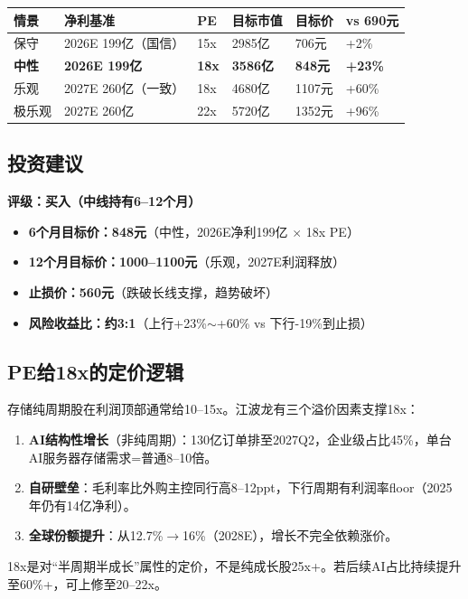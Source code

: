 \documentclass[a4paper,11pt,fontset=none]{ctexart}
\begin{document}
\begin{tabularx}{\textwidth}{L{2cm}L{3cm}L{1.5cm}L{2cm}L{2cm}X}
\toprule
\textbf{情景} & \textbf{净利基准} & \textbf{PE} & \textbf{目标市值} & \textbf{目标价} & \textbf{vs 690元} \\
\midrule
保守 & 2026E 199亿（国信） & 15x & 2985亿 & 706元 & +2\% \\
\textbf{中性} & \textbf{2026E 199亿} & \textbf{18x} & \textbf{3586亿} & \textbf{848元} & \textbf{+23\%} \\
乐观 & 2027E 260亿（一致） & 18x & 4680亿 & 1107元 & +60\% \\
极乐观 & 2027E 260亿 & 22x & 5720亿 & 1352元 & +96\% \\
\bottomrule
\end{tabularx}

\subsection*{投资建议}

\textbf{评级：买入（中线持有6--12个月）}

\begin{itemize}
  \item \textbf{6个月目标价：848元}（中性，2026E净利199亿 $\times$ 18x PE）
  \item \textbf{12个月目标价：1000--1100元}（乐观，2027E利润释放）
  \item \textbf{止损价：560元}（跌破长线支撑，趋势破坏）
  \item \textbf{风险收益比：约3:1}（上行+23\%$\sim$+60\% vs 下行-19\%到止损）
\end{itemize}

\subsection*{PE给18x的定价逻辑}

存储纯周期股在利润顶部通常给10--15x。江波龙有三个溢价因素支撑18x：
\begin{enumerate}
  \item \textbf{AI结构性增长}（非纯周期）：130亿订单排至2027Q2，企业级占比45\%，单台AI服务器存储需求=普通8--10倍。
  \item \textbf{自研壁垒}：毛利率比外购主控同行高8--12ppt，下行周期有利润率floor（2025年仍有14亿净利）。
  \item \textbf{全球份额提升}：从12.7\%$\to$16\%（2028E），增长不完全依赖涨价。
\end{enumerate}

18x是对``半周期半成长''属性的定价，不是纯成长股25x+。若后续AI占比持续提升至60\%+，可上修至20--22x。
\end{document}
